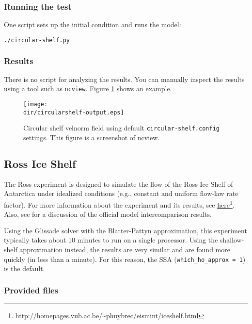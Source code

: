\subsubsection{Running the test}
One script sets up the initial condition and runs the model:

\texttt{./circular-shelf.py}

\subsubsection{Results}
There is no  script for analyzing the results.
You can manually inspect the results using a tool such as \texttt{ncview}.
Figure \ref{fig:circularshelf-results} shows an example.

\begin{figure}[H!]
	\centering
	\texttt{[image: \\dir/circularshelf-output.eps]}
	\caption{Circular shelf velnorm field using default \texttt{circular-shelf.config} settings. This figure is a screenshot of ncview.}
	\label{fig:circularshelf-results}
\end{figure}
\FloatBarrier

\subsection{Ross Ice Shelf}
\label{sc:ross_test}
The Ross experiment is designed to simulate the flow of the Ross Ice Shelf of Antarctica under idealized conditions (e.g., constant and uniform
flow-law rate factor). For more information about the experiment and its results, see 
\href{http://homepages.vub.ac.be/~phuybrec/eismint/iceshelf.html}{here}\footnote{http://homepages.vub.ac.be/\textasciitilde{}phuybrec/eismint/iceshelf.html}. 
Also, see \citet{MacAyeal:1996vn} for a discussion of the official model intercomparison results.

Using the Glissade solver with the Blatter-Pattyn approximation, this experiment typically 
takes about 10 minutes to run on a single processor.  Using the shallow-shelf approximation instead,
the results are very similar and are found more quickly (in less than a minute).
For this reason, the SSA (\texttt{which\_ho\_approx = 1}) is the default.

\subsubsection{Provided files}

